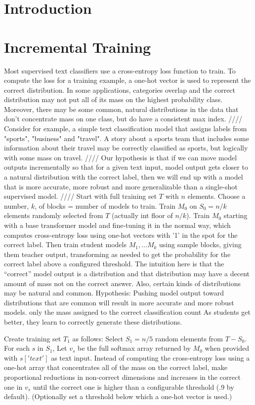 \documentclass[11pt,a4paper]{report}
\theoremstyle{plain}
\theoremstyle{definition}
\theoremstyle{remark}
\begin{document}
\section{Introduction}	

\section{Incremental Training}

Most supervised text classifiers use a cross-entropy loss function to train. To compute the loss for a training example, a one-hot vector is used to represent the correct distribution. In some applications, categories overlap and the correct distribution may not put all of its mass on the highest probability class.  Moreover, there may be some common, natural distributions in the data that don't concentrate mass on one class, but do have a consistent max index.  
////
Consider for example, a simple text classification model that assigns labels from {"sports", "business" and "travel"}. A story about a sports team that includes some information about their travel may be correctly classified as sports, but logically with some mass on travel. 
////
Our hypothesis is that if we can move model outputs incrementally so that for a given text input, model output gets closer to a natural distribution with the correct label, then we will end up with a model that is more accurate, more robust and more generalizable than a single-shot supervised model. 
////
Start with full training set $T$ with $n$ elements. Choose a number, $k$, of blocks = number of models to train. Train $M_0$ on $S_0 = n/k$ elements randomly selected from $T$ (actually int floor of $n/k$). Train $M_0$ starting with a base transformer model and fine-tuning it in the normal way, which computes cross-entropy loss using one-hot vectors with '1' in the spot for the correct label. Then train student models $M_1, ... M_k$ using sample blocks, giving them teacher output, transforming as needed to get the probability for the correct label above a configured threshold. The intuition here is that the ``correct'' model output is a distribution and that distribution may have a decent amount of mass not on the correct answer. Also, certain kinds of distributions may be natural and common.  Hypothesis: Pushing model output toward distributions that are common will result in more accurate and more robust models. only the mass assigned to the correct classification count  As students get better, they learn to correctly generate these distributions.

Create training set $T_1$ as follows: Select $S_1 = n/5$ random elements from $T - S_0$. For each $s$ in $S_1$, Let $v_s$ be the full softmax array returned by $M_0$ when provided with $s['text']$ as text input. Instead of computing the cross-entropy loss using a one-hot array that concentrates all of the mass on the correct label, make proportional reductions in non-correct dimensions and increases in the correct one in $v_s$ until the correct one is higher than a configurable threshold (.9 by default). (Optionally set a threshold below which a one-hot vector is used.)
\end{document}
